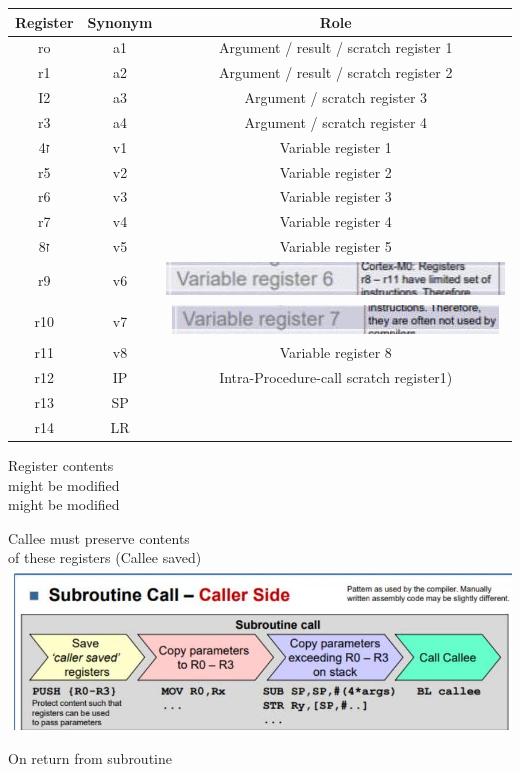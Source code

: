 \begin{center}
\begin{tabular}{|c|c|c|}
\hline
Register & Synonym & Role \\
\hline
ro & a1 & Argument / result / scratch register 1 \\
\hline
r1 & a2 & Argument / result / scratch register 2 \\
\hline
I2 & a3 & Argument / scratch register 3 \\
\hline
r3 & a4 & Argument / scratch register 4 \\
\hline
ז4 & v1 & Variable register 1 \\
\hline
r5 & v2 & Variable register 2 \\
\hline
r6 & v3 & Variable register 3 \\
\hline
r7 & v4 & Variable register 4 \\
\hline
ז8 & v5 & Variable register 5 \\
\hline
r9 & v6 & \includegraphics[width=\linewidth]{images/2024_12_29_79e6b22f503fb7b4f718g-09}
 \\
\hline
r10 & v7 & \includegraphics[width=\linewidth]{images/2024_12_29_79e6b22f503fb7b4f718g-09(1)}
 \\
\hline
r11 & v8 & Variable register 8 \\
\hline
r12 & IP & Intra-Procedure-call scratch register1) \\
\hline
r13 & SP &  \\
\hline
r14 & LR &  \\
\hline
\end{tabular}
\end{center}

Register contents\\
might be modified\\
might be modified

Callee must preserve contents\\
of these registers (Callee saved)\\
\includegraphics[width=\linewidth]{images/2024_12_29_79e6b22f503fb7b4f718g-09(3)}

On return from subroutine